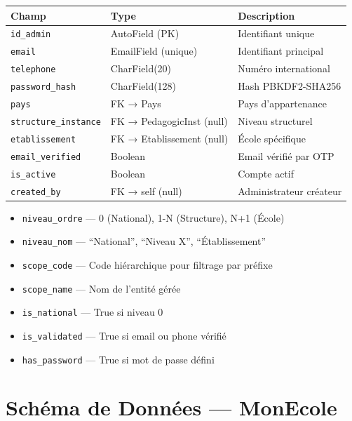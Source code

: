 \documentclass[12pt,a4paper,oneside]{report}
\begin{document}
\begin{center}
\begin{tabularx}{\textwidth}{l l X}
\toprule
\textbf{Champ} & \textbf{Type} & \textbf{Description} \\
\midrule
\texttt{id\_admin} & AutoField (PK) & Identifiant unique \\
\texttt{email} & EmailField (unique) & Identifiant principal \\
\texttt{telephone} & CharField(20) & Numéro international \\
\texttt{password\_hash} & CharField(128) & Hash PBKDF2-SHA256 \\
\texttt{pays} & FK → Pays & Pays d'appartenance \\
\texttt{structure\_instance} & FK → PedagogicInst (null) & Niveau structurel \\
\texttt{etablissement} & FK → Etablissement (null) & École spécifique \\
\texttt{email\_verified} & Boolean & Email vérifié par OTP \\
\texttt{is\_active} & Boolean & Compte actif \\
\texttt{created\_by} & FK → self (null) & Administrateur créateur \\
\bottomrule
\end{tabularx}
\end{center}

\begin{techbox}
\begin{itemize}[topsep=0pt, itemsep=2pt]
  \item \texttt{niveau\_ordre} — 0 (National), 1-N (Structure), N+1 (École)
  \item \texttt{niveau\_nom} — ``National'', ``Niveau X'', ``Établissement''
  \item \texttt{scope\_code} — Code hiérarchique pour filtrage par préfixe
  \item \texttt{scope\_name} — Nom de l'entité gérée
  \item \texttt{is\_national} — True si niveau 0
  \item \texttt{is\_validated} — True si email ou phone vérifié
  \item \texttt{has\_password} — True si mot de passe défini
\end{itemize}
\end{techbox}


\chapter{Schéma de Données — MonEcole}
\end{document}
